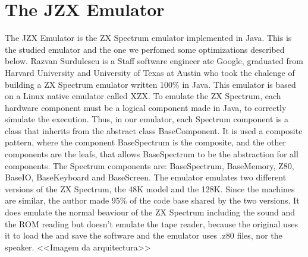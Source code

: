 \section{The JZX Emulator}
The JZX Emulator is the ZX Spectrum emulator implemented in Java. This is the studied emulator and the one we perfomed some optimizations described below.
Razvan Surdulescu is a Staff software engineer ate Google, graduated from Harvard University and University of Texas at Austin who took the chalenge of building a ZX Spectrum emulator written 100\% in Java. This emulator is based on a Linux native emulator called XZX.
To emulate the ZX Spectrum, each hardware component must be a logical component made in Java, to correctly simulate the execution. Thus, in our emulator, each Spectrum component is a class that inherits from the abstract class BaseComponent. It is used a composite pattern, where the component BaseSpectrum is the composite, and the other components are the leafs, that allows BaseSpectrum to be the abstraction for all components. The Spectrum components are: BaseSpectrum, BaseMemory, Z80, BaseIO, BaseKeyboard and  BaseScreen.
The emulator emulates two different versions of the ZX Spectrum, the 48K model and the 128K. Since the machines are similar, the author made 95\% of the code base shared by the two versions.
It does emulate the normal beaviour of the ZX Spectrum including the sound and the ROM reading but doesn’t emulate the tape reader, because the original uses it to load the and save the software and the emulator uses .z80 files, nor the speaker.
<<Imagem da arquitectura>>

